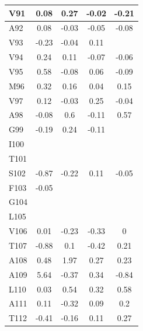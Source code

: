 \documentclass[%
 aip,
 amsmath,amssymb,
 preprint,%
]{revtex4-1}
\begin{document}
\begin{center}
\begin{longtable}{l|c|c|c|c}
V91 & 0.08 & 0.27 & -0.02 & -0.21 \\\hline
A92 & 0.08 & -0.03 & -0.05 & -0.08 \\\hline
V93 & -0.23 & -0.04 & 0.11 & \\\hline
V94 & 0.24 & 0.11 & -0.07 & -0.06 \\\hline
V95 & 0.58 & -0.08 & 0.06 & -0.09 \\\hline
M96 & 0.32 & 0.16 & 0.04 & 0.15 \\\hline
V97 & 0.12 & -0.03 & 0.25 & -0.04 \\\hline
A98 & -0.08 & 0.6 & -0.11 & 0.57 \\\hline
G99 & -0.19 & 0.24 & -0.11 & \\\hline
I100 & & & & \\\hline
T101 & & & & \\\hline
S102 & -0.87 & -0.22 & 0.11 & -0.05 \\\hline
F103 & -0.05 & & & \\\hline
G104 & & & & \\\hline
L105 & & & & \\\hline
V106 & 0.01 & -0.23 & -0.33 & 0 \\\hline
T107 & -0.88 & 0.1 & -0.42 & 0.21 \\\hline
A108 & 0.48 & 1.97 & 0.27 & 0.23 \\\hline
A109 & 5.64 & -0.37 & 0.34 & -0.84 \\\hline
L110 & 0.03 & 0.54 & 0.32 & 0.58 \\\hline
A111 & 0.11 & -0.32 & 0.09 & 0.2 \\\hline
T112 & -0.41 & -0.16 & 0.11 & 0.27 \\\hline
\end{longtable}
\end{center}
\endgroup
\end{document}
